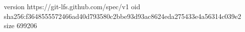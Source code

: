 version https://git-lfs.github.com/spec/v1
oid sha256:f3648555572466ad40d793580c2bbe93d93ac8624eda275433e4a56314c039e2
size 699206
